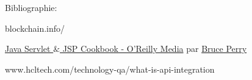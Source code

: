 \documentclass[12pt]{article}
\begin{document}
\begin{enumerate}
\vspace{\baselineskip}

\vspace{\baselineskip}

\vspace{\baselineskip}

\vspace{\baselineskip}

\vspace{\baselineskip}

\vspace{\baselineskip}

\vspace{\baselineskip}

\vspace{\baselineskip}
Bibliographie:\par

blockchain.info/\par

\href{http://shop.oreilly.com/product/9780596005726.do}{Java Servlet $\&$  JSP Cookbook - O'Reilly Media} par \href{http://www.oreillynet.com/pub/au/674}{Bruce Perry}\par

www.hcltech.com/technology-qa/what-is-api-integration\par


\vspace{\baselineskip}

\vspace{\baselineskip}
\setlength{\parskip}{6.96pt}

\end{enumerate}
\printbibliography
\end{document}
